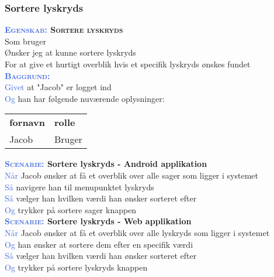 \clearpage

\subsubsection{Sortere lyskryds}
\textbf{\textsc{\textcolor{RoyalBlue}{Egenskab:} Sortere lyskryds}}\\
Som bruger\\
Ønsker jeg at kunne sortere lyskryds\\
For at give et hurtigt overblik hvis et specifik lyskryds ønskes fundet\\

\textsc{\textcolor{RoyalBlue}{\textbf{Baggrund:}}}\\
\textcolor{RoyalBlue}{Givet} at "Jacob" er logget ind\\
\textcolor{RoyalBlue}{Og} han har følgende nuværende oplysninger:\\
\begin{tabular}{| l | l |}
	\textbf{fornavn} & \textbf{rolle} \\
	Jacob & Bruger\\
\end{tabular}
\newline \newline

\textbf{\textsc{\textcolor{RoyalBlue}{Scenarie:}} Sortere lyskryds - Android applikation}\\
\textcolor{RoyalBlue}{Når} Jacob ønsker at få et overblik over alle sager som ligger i systemet\\
\textcolor{RoyalBlue}{Så} navigere han til menupunktet lyskryds\\
\textcolor{RoyalBlue}{Så} vælger han hvilken værdi han ønsker sorteret efter\\
\textcolor{RoyalBlue}{Og} trykker på sortere sager knappen\\

\textbf{\textsc{\textcolor{RoyalBlue}{Scenarie:}} Sortere lyskryds - Web applikation}\\
\textcolor{RoyalBlue}{Når} Jacob ønsker at få et overblik over alle lyskryds som ligger i systemet\\
\textcolor{RoyalBlue}{Og} han ønsker at sortere dem efter en specifik værdi\\
\textcolor{RoyalBlue}{Så} vælger han hvilken værdi han ønsker sorteret efter\\
\textcolor{RoyalBlue}{Og} trykker på sortere lyskryds knappen\\

